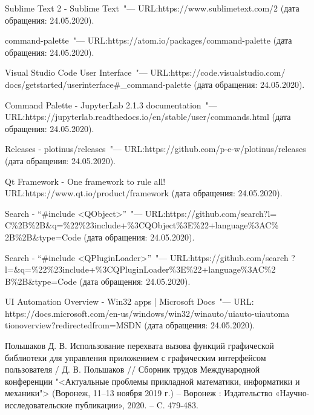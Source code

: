 \renewcommand{\bibname}{Список использованных источников}
\begin{thebibliography}{99}

 Sublime Text 2 \-- Sublime Text~"---
URL:\@ https://www.sublimetext.com/2
(дата обращения: 24.05.2020).

 command-palette~"---
URL:\@ https://atom.io/packages/command-palette
(дата обращения: 24.05.2020).

 Visual Studio Code User Interface~"---
URL:\@ https://code.visualstudio.com/\allowbreak
docs/getstarted/userinterface\#\_command-palette
(дата обращения: 24.05.2020).

 Command Palette \-- JupyterLab 2.1.3 documentation~"---
URL:\@ https://\allowbreak jupyterlab.readthedocs.io/en/stable/user/commands.html
(дата обращения: 24.05.2020).

 Releases \-- plotinus/releases~"---
URL:\@  https://github.com/p-e-w/plotinus/\allowbreak releases
(дата обращения: 24.05.2020).

 Qt Framework - One framework to rule all!
URL:\@ https://www.qt.io/product/\allowbreak framework
(дата обращения: 24.05.2020).

 Search \-- ``\#include <QObject>''~"---
URL:\@ https://github.com/search?l=\allowbreak
C\%2B\%2B\&q=\%22\%23include+\%3CQObject\%3E\%22+language\%3AC\%\allowbreak
2B\%2B\&type=Code
(дата обращения: 24.05.2020).

 Search \-- ``\#include <QPluginLoader>''~"---
URL:\@ https://github.com/search\allowbreak
?l=\&q=\%22\%23include+\%3CQPluginLoader\%3E\%22+language\%3AC\%2\allowbreak
B\%2B\&type=Code
(дата обращения: 24.05.2020).

 UI Automation Overview \-- Win32 apps |
Microsoft Docs~"--- URL:\@
https://docs.microsoft.com/en-us/windows/win32/winauto/uiauto-uiautoma\allowbreak
tionoverview?redirectedfrom=MSDN
(дата обращения: 24.05.2020).

 Польшаков Д. В. Использование перехвата вызова функций
графической библиотеки для управления приложением с графическим интерфейсом
пользователя / Д. В. Польшаков // Сборник трудов Международной конференции
"<Актуальные проблемы прикладной математики, информатики и механики">
(Воронеж, 11–13 ноября 2019 г.) – Воронеж : Издательство «Научно-исследовательские
публикации», 2020. – C. 479-483.


\end{thebibliography}
